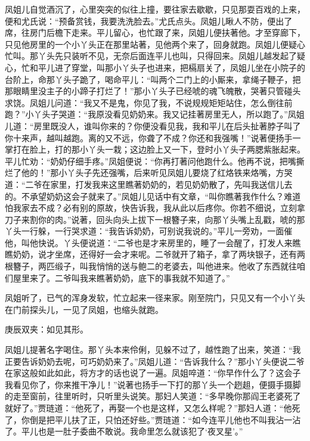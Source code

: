 \begin{parag}
    凤姐儿自觉酒沉了，心里突突的似往上撞，要往家去歇歇，只见那耍百戏的上来，便和尤氏说：“预备赏钱，我要洗洗脸去。”尤氏点头。凤姐儿瞅人不防，便出了席，往房门后檐下走来。平儿留心，也忙跟了来，凤姐儿便扶著他。才至穿廊下，只见他房里的一个小丫头正在那里站著，见他两个来了，回身就跑。凤姐儿便疑心忙叫。那丫头先只装听不见，无奈后面连平儿也叫，只得回来。凤姐儿越发起了疑心，忙和平儿进了穿堂，叫那小丫头子也进来，把槅扇关了，凤姐儿坐在小院子的台阶上，命那丫头子跪了，喝命平儿：“叫两个二门上的小厮来，拿绳子鞭子，把那眼睛里没主子的小蹄子打烂了！”那小丫头子已经唬的魂飞魄散，哭著只管碰头求饶。凤姐儿问道：“我又不是鬼，你见了我，不说规规矩矩站住，怎么倒往前跑？”小丫头子哭道：“我原没看见奶奶来。我又记挂著房里无人，所以跑了。”凤姐儿道：“房里既没人，谁叫你来的？你便没看见我，我和平儿在后头扯著脖子叫了你十来声，越叫越跑。离的又不远，你聋了不成？你还和我强嘴！”说著便扬手一掌打在脸上，打的那小丫头一栽；这边脸上又一下，登时小丫头子两腮紫胀起来。平儿忙劝：“奶奶仔细手疼。”凤姐便说：“你再打著问他跑什么。他再不说，把嘴撕烂了他的！”那小丫头子先还强嘴，后来听见凤姐儿要烧了红烙铁来烙嘴，方哭道：“二爷在家里，打发我来这里瞧著奶奶的，若见奶奶散了，先叫我送信儿去的。不承望奶奶这会子就来了。”凤姐儿见话中有文章，“叫你瞧著我作什么？难道怕我家去不成？必有别的原故，快告诉我，我从此以后疼你。你若不细说，立刻拿刀子来割你的肉。”说著，回头向头上拔下一根簪子来，向那丫头嘴上乱戳，唬的那丫头一行躲，一行哭求道：“我告诉奶奶，可别说我说的。”平儿一旁劝，一面催他，叫他快说。丫头便说道：“二爷也是才来房里的，睡了一会醒了，打发人来瞧瞧奶奶，说才坐席，还得好一会才来呢。二爷就开了箱子，拿了两块银子，还有两根簪子，两匹缎子，叫我悄悄的送与鲍二的老婆去，叫他进来。他收了东西就往咱们屋里来了。二爷叫我来瞧著奶奶，底下的事我就不知道了。”
\end{parag}


\begin{parag}
    凤姐听了，已气的浑身发软，忙立起来一径来家。刚至院门，只见又有一个小丫头在门前探头儿，一见了凤姐，也缩头就跑。\begin{note}庚辰双夹：如见其形。\end{note}凤姐儿提著名字喝住。那丫头本来伶俐，见躲不过了，越性跑了出来，笑道：“我正要告诉奶奶去呢，可巧奶奶来了。”凤姐儿道：“告诉我什么？”那小丫头便说二爷在家这般如此如此，将方才的话也说了一遍。凤姐啐道：“你早作什么了？这会子我看见你了，你来推干净儿！”说著也扬手一下打的那丫头一个趔趄，便摄手摄脚的走至窗前，往里听时，只听里头说笑。那妇人笑道：“多早晚你那阎王老婆死了就好了。”贾琏道：“他死了，再娶一个也是这样，又怎么样呢？”那妇人道：“他死了，你倒是把平儿扶了正，只怕还好些。”贾琏道：“如今连平儿他也不叫我沾一沾了。平儿也是一肚子委曲不敢说。我命里怎么就该犯了‘夜叉星’。”
\end{parag}


